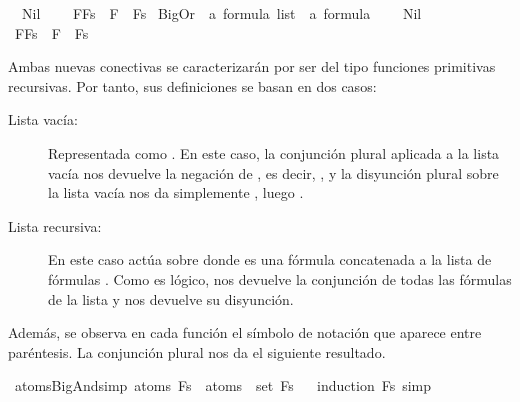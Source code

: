 \begin{isabellebody}
\ \ {\isachardoublequoteopen}\isactrlbold {\isasymAnd}Nil\ {\isacharequal}\ {\isacharparenleft}\isactrlbold {\isasymnot}{\isasymbottom}{\isacharparenright}{\isachardoublequoteclose}\ \isanewline
{\isacharbar}\ {\isachardoublequoteopen}\isactrlbold {\isasymAnd}{\isacharparenleft}F{\isacharhash}Fs{\isacharparenright}\ {\isacharequal}\ F\ \isactrlbold {\isasymand}\ \isactrlbold {\isasymAnd}Fs{\isachardoublequoteclose}\isanewline
\isanewline
{}\isamarkupfalse%
\ BigOr\ {\isacharcolon}{\isacharcolon}\ {\isachardoublequoteopen}{\isacharprime}a\ formula\ list\ {\isasymRightarrow}\ {\isacharprime}a\ formula{\isachardoublequoteclose}\ {\isacharparenleft}{\isachardoublequoteopen}\isactrlbold {\isasymOr}{\isacharunderscore}{\isachardoublequoteclose}{\isacharparenright}\ \isanewline
\ \ {\isachardoublequoteopen}\isactrlbold {\isasymOr}Nil\ {\isacharequal}\ {\isasymbottom}{\isachardoublequoteclose}\ \isanewline
{\isacharbar}\ {\isachardoublequoteopen}\isactrlbold {\isasymOr}{\isacharparenleft}F{\isacharhash}Fs{\isacharparenright}\ {\isacharequal}\ F\ \isactrlbold {\isasymor}\ \isactrlbold {\isasymOr}Fs{\isachardoublequoteclose}%
\begin{isamarkuptext}%
Ambas nuevas conectivas se caracterizarán por ser del tipo funciones primitivas recursivas. Por
tanto, sus definiciones se basan en dos casos:
  \begin{description}
  \item[Lista vacía:] Representada como . En este caso, la conjunción plural aplicada a la lista
vacía nos devuelve la negación de , es decir, , y la disyunción plural sobre la lista
vacía nos da simplemente , luego . 
  \item[Lista recursiva:] En este caso actúa sobre  donde  es una fórmula concatenada a la
lista de fórmulas . Como es lógico,  nos devuelve la conjunción de todas las fórmulas
de la lista y  nos devuelve su disyunción.
  \end{description}
Además, se observa en cada función el símbolo de notación que aparece entre paréntesis.
La conjunción plural nos da el siguiente resultado.%
\end{isamarkuptext}\isamarkuptrue%
\isamarkupfalse%
\ atoms{\isacharunderscore}BigAnd{\isacharbrackleft}simp{\isacharbrackright}{\isacharcolon}\ {\isachardoublequoteopen}atoms\ {\isacharparenleft}\isactrlbold {\isasymAnd}Fs{\isacharparenright}\ {\isacharequal}\ {\isasymUnion}{\isacharparenleft}atoms\ {\isacharbackquote}\ set\ Fs{\isacharparenright}{\isachardoublequoteclose}\isanewline
%
\isadelimproof
\ \ %
\endisadelimproof
%
\isatagproof
{}\isamarkupfalse%
{\isacharparenleft}induction\ Fs{\isacharsemicolon}\ simp{\isacharparenright}\isanewline
\isanewline
%
\endisatagproof
{\isafoldproof}%
%
\isadelimproof
%
\endisadelimproof
%
\isadelimtheory
%
\endisadelimtheory
%
\isatagtheory
%
\endisatagtheory
{\isafoldtheory}%
%
\isadelimtheory
%
\endisadelimtheory
%
\end{isabellebody}%
